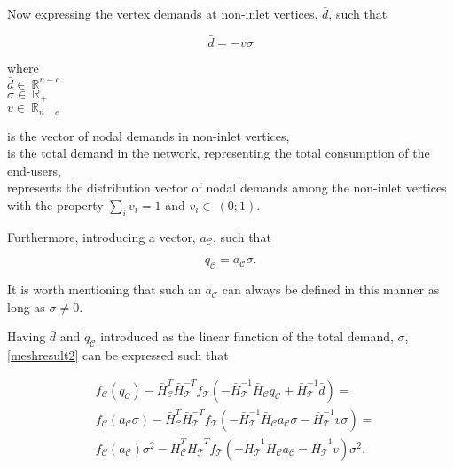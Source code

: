 Now expressing the vertex demands at non-inlet vertices, $\bar{d}$, such that

\begin{equation}
\label{noninlet_demand}
\bar{d} = - v \sigma
\end{equation}

  \begin{minipage}[t]{0.20\textwidth}
where\\
\hspace*{8mm} $\bar{d} \in \: \mathbb{R}^{n-c}$\\
\hspace*{8mm} $\sigma \in \: \mathbb{R}_{+}$ \\
\newline
\hspace*{8mm} $v \in \: \mathbb{R}_{n-c}$
\end{minipage}
\begin{minipage}[t]{0.68\textwidth}
\vspace*{2mm}
is the vector of nodal demands in non-inlet vertices,\\
is the total demand in the network, representing the total consumption of the end-users,\\
represents the distribution vector of nodal demands among the non-inlet vertices with the property $\sum_{i} v_i = 1 $ and $v_i \in \: (0;1)$.
\end{minipage}

Furthermore, introducing a vector, $a_{\mathcal{C}}$, such that 

\begin{equation}
\label{ac}
q_{\mathcal{C}} = a_{\mathcal{C}} \sigma.
\end{equation}

It is worth mentioning that such an $a_{\mathcal{C}}$ can always be defined in this manner as long as $\sigma \neq 0$.

Having $\bar{d}$ and $q_{\mathcal{C}}$ introduced as the linear function of the total demand, $\sigma$, \eqref{meshresult2} can be expressed such that

\begin{equation}
\begin{split}
\label{meshresult3}
& f_{\mathcal{C}}(q_\mathcal{C}) -\bar{H}^T_{\mathcal{C}}\bar{H}^{-T}_{\mathcal{T}} f_{\mathcal{T}}(-\bar{H}^{-1}_{\mathcal{T}} \bar{H}_{\mathcal{C}} q_\mathcal{C} + \bar{H}^{-1}_{\mathcal{T}} \bar{d}) = \\
& f_{\mathcal{C}}(a_{\mathcal{C}} \sigma) -\bar{H}^T_{\mathcal{C}}\bar{H}^{-T}_{\mathcal{T}} f_{\mathcal{T}}(-\bar{H}^{-1}_{\mathcal{T}} \bar{H}_{\mathcal{C}} a_{\mathcal{C}} \sigma - \bar{H}^{-1}_{\mathcal{T}} v \sigma) = \\
& f_{\mathcal{C}}(a_{\mathcal{C}})\sigma^2 -\bar{H}^T_{\mathcal{C}}\bar{H}^{-T}_{\mathcal{T}} f_{\mathcal{T}}(-\bar{H}^{-1}_{\mathcal{T}} \bar{H}_{\mathcal{C}} a_{\mathcal{C}} - \bar{H}^{-1}_{\mathcal{T}} v) \sigma^2.
\end{split}
\end{equation} 

